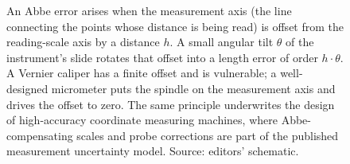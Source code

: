 \begin{figure}[ht]
\begin{tikzpicture}[x=1cm, y=1cm, font=\small]
\end{tikzpicture}
\caption[Abbe error in length measurement]{An Abbe error arises when
the measurement axis (the line connecting the points whose distance
is being read) is offset from the reading-scale axis by a distance
$h$. A small angular tilt $\theta$ of the instrument's slide rotates
that offset into a length error of order $h \cdot \theta$. A Vernier
caliper has a finite offset and is vulnerable; a well-designed
micrometer puts the spindle on the measurement axis and drives the
offset to zero. The same principle underwrites the design of
high-accuracy coordinate measuring machines, where Abbe-compensating
scales and probe corrections are part of the published measurement
uncertainty model. Source: editors' schematic.}
\label{fig:vol01:ch07:abbe-error}
\end{figure}
